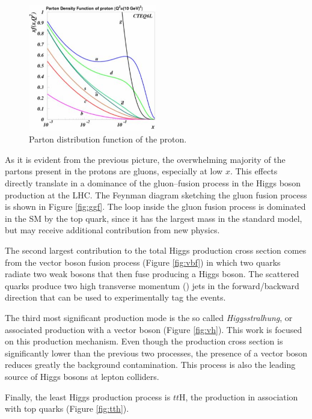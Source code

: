 \begin{figure}
\centering
\includegraphics[width=0.5\textwidth]{1_Introduction_Th_and_Exp/pics/pdf.jpg}
\caption{Parton distribution function of the proton.}
\label{fig:pdf}
\end{figure}

As it is evident from the previous picture, the overwhelming majority of the partons present in the protons are gluons, especially at low $x$. This effects directly translate in a dominance of the gluon--fusion process in the Higgs boson production at the LHC. The Feynman diagram sketching the gluon fusion process is shown in Figure \ref{fig:ggf}. The loop inside the gluon fusion process is dominated in the SM by the top quark, since it has the largest mass in the standard model, but may receive additional contribution from new physics. 

The second largest contribution to the total Higgs production cross section comes from the vector boson fusion process (Figure \ref{fig:vbf}) in which two quarks radiate two weak bosons that then fuse producing a Higgs boson. The scattered quarks produce two high transverse momentum (\pT) jets in the forward/backward direction that can be used to experimentally tag the events.

The third most significant production mode is the so called \emph{Higgsstralhung}, or associated production with a vector boson (Figure \ref{fig:vh}). This work is focused on this production mechanism. Even though the production cross section is significantly lower than the previous two processes, the presence of a vector boson reduces greatly the background contamination. This process is also the leading source of Higgs bosons at lepton colliders.

Finally, the least Higgs production process is $tt$H, the production in association with top quarks (Figure \ref{fig:tth}). 

